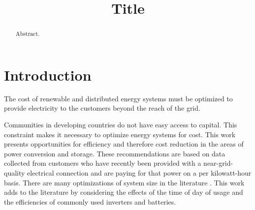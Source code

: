 \documentclass[conference]{IEEEtran}
\title{Title}
\begin{document}


\maketitle

\begin{abstract}
Abstract.
\end{abstract}

\section{Introduction}

The cost of renewable and distributed energy systems must be
optimized to provide electricity to the customers beyond the
reach of the grid.

Communities in developing countries do not have easy access
to capital.
This constraint makes it necessary to optimize energy systems
for cost.
This work presents opportunities for efficiency and therefore
cost reduction in the areas of power conversion and storage.
These recommendations are based on data collected from customers
who have recently been provided with a near-grid-quality
electrical connection and are paying for that power on a
per kilowatt-hour basis.
There are many optimizations of system size in the literature
\cite{optimizations}.
This work adds to the literature by considering the effects
of the time of day of usage and the efficiencies of commonly
used inverters and batteries.
\end{document}
